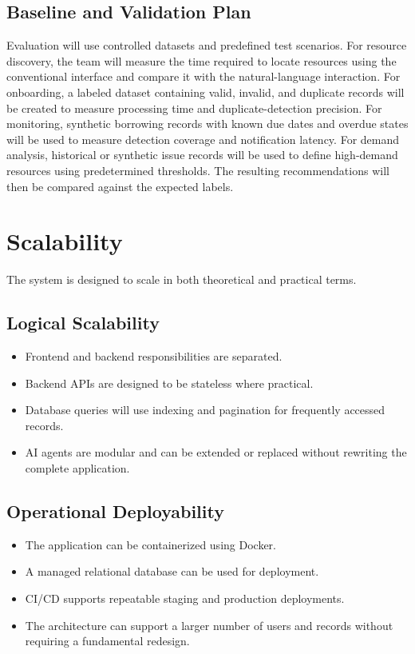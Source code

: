 \documentclass[11pt]{article}
\begin{document}
\subsection{Baseline and Validation Plan}
Evaluation will use controlled datasets and predefined test scenarios.
For resource discovery, the team will measure the time required to locate resources using the conventional interface and compare it with the natural-language interaction.
For onboarding, a labeled dataset containing valid, invalid, and duplicate records will be created to measure processing time and duplicate-detection precision.
For monitoring, synthetic borrowing records with known due dates and overdue states will be used to measure detection coverage and notification latency.
For demand analysis, historical or synthetic issue records will be used to define high-demand resources using predetermined thresholds. The resulting recommendations will then be compared against the expected labels.

\section{Scalability}
The system is designed to scale in both theoretical and practical terms.

\subsection{Logical Scalability}
\begin{itemize}
    \item Frontend and backend responsibilities are separated.
    \item Backend APIs are designed to be stateless where practical.
    \item Database queries will use indexing and pagination for frequently accessed records.
    \item AI agents are modular and can be extended or replaced without rewriting the complete application.
\end{itemize}

\subsection{Operational Deployability}
\begin{itemize}
    \item The application can be containerized using Docker.
    \item A managed relational database can be used for deployment.
    \item CI/CD supports repeatable staging and production deployments.
    \item The architecture can support a larger number of users and records without requiring a fundamental redesign.
\end{itemize}
\end{document}
